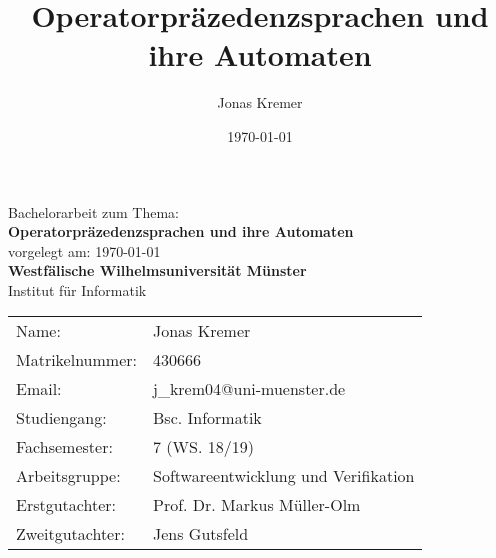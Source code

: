 \documentclass[11pt]{article}
\author{Jonas Kremer}
\title{Operatorpräzedenzsprachen und ihre Automaten}
\date{\today{}}
\theoremstyle{remark}
\begin{document}
\begin{titlepage}
    \begin{center}
    \large Bachelorarbeit zum Thema:\\
    \vspace{0.5cm}
    \huge \textbf{\textbf{Operatorpräzedenzsprachen und ihre Automaten}} \\
    \vspace{1cm}
    \normalsize
    vorgelegt am: \today \\
    \vspace{2.5cm}
    \large \textbf{Westfälische Wilhelmsuniversität Münster}\\
    \vspace{0.5cm} 
    Institut für Informatik
    \vspace{2cm}
    \end{center}
 \normalsize{
    \begin{tabular}{ll}
    	Name: & Jonas Kremer \\
    	Matrikelnummer: & 430666 \\
    	Email: & j\_krem04@uni-muenster.de \\
    	Studiengang: & Bsc. Informatik\\
    	Fachsemester: & 7 (WS. 18/19)\\
    	Arbeitsgruppe: & Softwareentwicklung und Verifikation \\
      	Erstgutachter: & Prof. Dr. Markus Müller-Olm \\
      	Zweitgutachter: & Jens Gutsfeld \\
    \end{tabular}\\
    }
\end{titlepage}
\setcounter{tocdepth}{2}
\tableofcontents
\thispagestyle{empty}
\newpage

\nocite{*}












\thispagestyle{empty}





\end{document}
